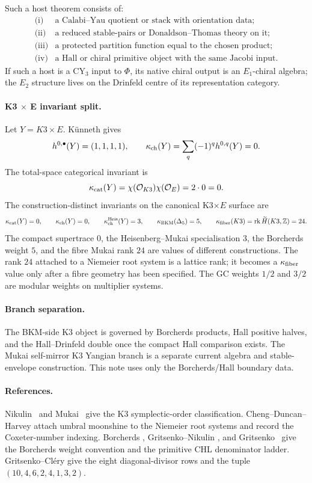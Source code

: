 Such a host theorem consists of:
\[
\begin{array}{ll}
\text{(i)}&\text{a Calabi--Yau quotient or stack with orientation data;}\\
\text{(ii)}&\text{a reduced stable-pairs or Donaldson--Thomas theory on it;}\\
\text{(iii)}&\text{a protected partition function equal to the chosen product;}\\
\text{(iv)}&\text{a Hall or chiral primitive object with the same Jacobi input.}
\end{array}
\]
If such a host is a CY$_3$ input to $\Phi$, its native chiral output is
an $E_1$-chiral algebra; the $E_2$ structure lives on the Drinfeld
centre of its representation category.

\paragraph{K3 \texorpdfstring{$\times$}{x} E invariant split.}
Let $Y=K3\times E$.  K\"unneth gives
\[
  h^{0,\bullet}(Y)=(1,1,1,1),\qquad
  \kappa_{\mathrm{ch}}(Y)=\sum_q(-1)^qh^{0,q}(Y)=0.
\]
The total-space categorical invariant is
\[
  \kappa_{\mathrm{cat}}(Y)=\chi(\mathcal O_{K3})\chi(\mathcal O_E)=2\cdot0=0.
\]
The construction-distinct invariants on the canonical K3$\times E$
surface are
\[
  \kappa_{\mathrm{cat}}(Y)=0,\qquad
  \kappa_{\mathrm{ch}}(Y)=0,\qquad
  \kappa_{\mathrm{ch}}^{\mathrm{Heis}}(Y)=3,\qquad
  \kappa_{\mathrm{BKM}}(\Delta_5)=5,\qquad
  \kappa_{\mathrm{fiber}}(K3)=\operatorname{rk}\widetilde H(K3,\mathbb Z)=24.
\]
The compact supertrace $0$, the Heisenberg--Mukai specialisation $3$,
the Borcherds weight $5$, and the fibre Mukai rank $24$ are values of
different constructions.  The rank $24$ attached to a Niemeier root
system is a lattice rank; it becomes a $\kappa_{\mathrm{fiber}}$ value only after a fibre
geometry has been specified.  The GC weights $1/2$ and $3/2$ are modular
weights on multiplier systems.

\paragraph{Branch separation.}
The BKM-side K3 object is governed by Borcherds products, Hall positive
halves, and the Hall--Drinfeld double once the compact Hall comparison
exists.  The Mukai self-mirror K3 Yangian branch is a separate current
algebra and stable-envelope construction.  This note uses only the
Borcherds/Hall boundary data.

\paragraph{References.}
Nikulin~\cite{Nikulin1980} and Mukai~\cite{Mukai1988} give the K3
symplectic-order classification.  Cheng--Duncan--Harvey
\cite{ChengDuncanHarvey2014} attach umbral moonshine to the Niemeier
root systems and record the Coxeter-number indexing.  Borcherds
\cite[Thm.~13.3]{Borcherds1998}, Gritsenko--Nikulin
\cite{GritsenkoNikulin1995,GritsenkoNikulin1998}, and
Gritsenko~\cite{Gritsenko1999} give the Borcherds weight convention and
the primitive CHL denominator ladder.  Gritsenko--Cl\'ery
\cite[Thm.~1.4 and Thm.~3.1]{GritsenkoClery2013} give the eight
diagonal-divisor rows and the tuple $(10,4,6,2,4,1,3,2)$.

